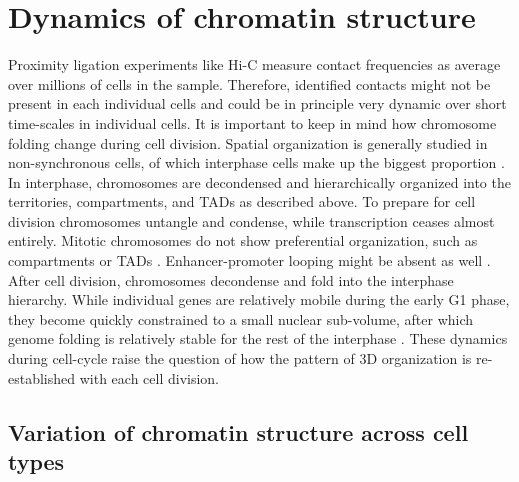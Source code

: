 \documentclass[a4paper,twoside=true,openright,parskip=full,chapterprefix=true,11pt,headings=normal,bibliography=totoc,listof=totoc,titlepage=on,captions=tableabove,draft=false]{scrreprt}
\theoremstyle{definition}
\theoremstyle{definition}
\theoremstyle{definition}
\theoremstyle{remark}
\begin{document}
\hypertarget{dynamics-of-chromatin-structure}{%
\section{Dynamics of chromatin
structure}\label{dynamics-of-chromatin-structure}}

Proximity ligation experiments like Hi-C measure contact frequencies as
average over millions of cells in the sample. Therefore, identified
contacts might not be present in each individual cells and could be in
principle very dynamic over short time-scales in individual cells. It is
important to keep in mind how chromosome folding change during cell
division. Spatial organization is generally studied in non-synchronous
cells, of which interphase cells make up the biggest proportion
\citep{Bouwman2015}. In interphase, chromosomes are decondensed and
hierarchically organized into the territories, compartments, and TADs as
described above. To prepare for cell division chromosomes untangle and
condense, while transcription ceases almost entirely. Mitotic
chromosomes do not show preferential organization, such as compartments
or TADs \citep{Naumova2013}. Enhancer-promoter looping might be absent
as well \citep{Dekker2014}. After cell division, chromosomes decondense
and fold into the interphase hierarchy. While individual genes are
relatively mobile during the early G1 phase, they become quickly
constrained to a small nuclear sub-volume, after which genome folding is
relatively stable for the rest of the interphase
\citep{Chubb2002, Walter2003}. These dynamics during cell-cycle raise
the question of how the pattern of 3D organization is re-established
with each cell division.

\hypertarget{variation-of-chromatin-structure-across-cell-types}{%
\subsection{Variation of chromatin structure across cell
types}\label{variation-of-chromatin-structure-across-cell-types}}
\end{document}

